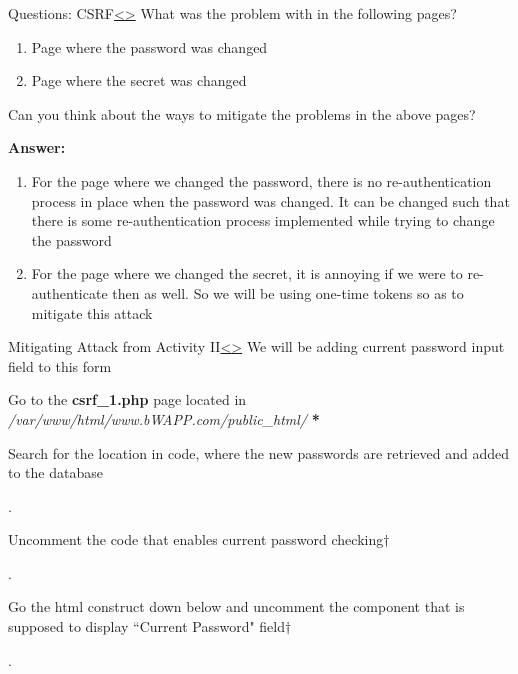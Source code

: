\documentclass[12pt]{extarticle}
\newenvironment{instructionblock}{\Large\bgroup}{\egroup}
\begin{document}


\pagebreak
\begin{slide}{Questions: CSRF}{\hyperref[slide 17]{\textless}\hyperref[slide 19]{\textgreater}}
	\begin{instructionblock}
		What was the problem with in the following pages? 
		\begin{enumerate}
			\item Page where the password was changed
			\item Page where the secret was changed
		\end{enumerate}
		Can you think about the ways to mitigate the problems in the above pages?
	\end{instructionblock}	
\end{slide}

\vspace{2mm}
\noindent
\vfill
\textbf{Answer:}\\
\begin{enumerate}
	\item For the page where we changed the password, there is no re-authentication process in place when the password was changed. It can be changed such that there is some re-authentication process implemented while trying to change the password 
	\item For the page where we changed the secret, it is annoying if we were to re-authenticate then as well. So we will be using one-time tokens so as to mitigate this attack  
\end{enumerate}




\pagebreak
\begin{slide}{Mitigating Attack from Activity II}{\hyperref[slide 18]{\textless}\hyperref[slide 20]{\textgreater}}
	\begin{instructionblock}
		{We will be adding current password input field to this form}
		\begin{enumerate}
			{\item Go to the \textbf{csrf\_1.php} page located in \textit{/var/www/html/www.bWAPP.com/public\_html/}\newline
			\textbf{*}}
			{\item Search for the location in code, where the new passwords are retrieved and added to the database}.
			{\item Uncomment the code that enables current password checking\textbf{$\dagger$}}.
			{\item Go the html construct down below and uncomment the component that is supposed to display ``Current Password" field\textbf{$\dagger$}}. 
		\end{enumerate}
	\end{instructionblock}	
\end{slide}
\end{document}
